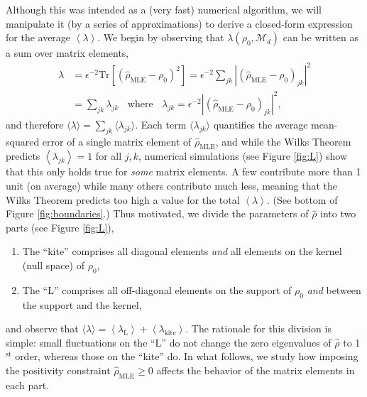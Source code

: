 \documentclass[aps,pra, twocolumn]{revtex4-1}
\newcommand{\M}{\mathcal{M}}
\newcommand{\expect}[1]{\ensuremath{\left\langle#1\right\rangle}}
\newcommand{\rhohat}{\hat{\rho}}
\newcommand{\rhoMLE}{\rhohat_{\scriptscriptstyle\mathrm{MLE}}}
\begin{document}
Although this was intended as a (very fast) numerical algorithm, we will manipulate it (by a series of approximations) to derive a closed-form expression for the average $\expect{\lambda}$.  We begin by observing that $\lambda(\rho_{0}, \M_{d})$ can be written as a sum over matrix elements,
\begin{align}
\label{eq:llrserrors}
\nonumber \lambda &=\epsilon^{-2}\mathrm{Tr}[(\rhoMLE - \rho_{0})^{2}] = \epsilon^{-2}\sum_{jk}|(\rhoMLE- \rho_{0} )_{jk}|^{2}\\
&= \sum_{jk}\lambda_{jk}~~~~\text{where}~~~~\lambda_{jk} = \epsilon^{-2}|(\rhoMLE - \rho_{0} )_{jk} |^{2},
\end{align}
and therefore $\langle \lambda \rangle = \sum_{jk}\langle\lambda_{jk}\rangle$.  Each term $\langle \lambda_{jk}\rangle$ quantifies the average mean-squared error of a single matrix element of $\rhoMLE$, and while the Wilks Theorem predicts $\expect{\lambda_{jk}}=1$ for all $j,k$, numerical simulations (see Figure \ref{fig:L}) show that this only holds true for \emph{some} matrix elements.  A few contribute more than 1 unit (on average) while many others contribute much less, meaning that the Wilks Theorem predicts too high a value for the total $\expect{\lambda}$.  (See bottom of Figure \ref{fig:boundaries}.) Thus motivated, we divide the parameters of $\rhohat$ into two parts (see Figure \ref{fig:L}),
\begin{enumerate}[noitemsep]
\item The ``kite'' comprises all diagonal elements \emph{and} all elements on the kernel (null space) of $\rho_0$,
\item The ``L'' comprises all off-diagonal elements on the support of $\rho_0$ \emph{and} between the support and the kernel,
\end{enumerate}
and observe that $\langle\lambda\rangle = \expect{\lambda_{\mathrm{L}}} + \expect{\lambda_{\mathrm{kite}}}$.  The rationale for this division is simple:  small fluctuations on the ``L'' do not change the zero eigenvalues of $\hat\rho$ to 1$^{\mathrm{st}}$ order, whereas those on the ``kite'' do. In what follows, we study how imposing the positivity constraint $\rhoMLE \geq 0$ affects the behavior of the matrix elements in each part.
\end{document}
